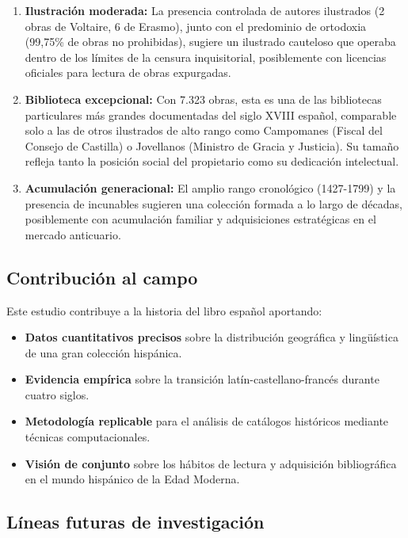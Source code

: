\documentclass[12pt,a4paper]{article}
\begin{document}
\begin{enumerate}
    \item \textbf{Ilustración moderada:} La presencia controlada de autores ilustrados (2 obras de Voltaire, 6 de Erasmo), junto con el predominio de ortodoxia (99,75\% de obras no prohibidas), sugiere un ilustrado cauteloso que operaba dentro de los límites de la censura inquisitorial, posiblemente con licencias oficiales para lectura de obras expurgadas.

    \item \textbf{Biblioteca excepcional:} Con 7.323 obras, esta es una de las bibliotecas particulares más grandes documentadas del siglo XVIII español, comparable solo a las de otros ilustrados de alto rango como Campomanes (Fiscal del Consejo de Castilla) o Jovellanos (Ministro de Gracia y Justicia). Su tamaño refleja tanto la posición social del propietario como su dedicación intelectual.

    \item \textbf{Acumulación generacional:} El amplio rango cronológico (1427-1799) y la presencia de incunables sugieren una colección formada a lo largo de décadas, posiblemente con acumulación familiar y adquisiciones estratégicas en el mercado anticuario.
\end{enumerate}

\subsection{Contribución al campo}

Este estudio contribuye a la historia del libro español aportando:

\begin{itemize}
    \item \textbf{Datos cuantitativos precisos} sobre la distribución geográfica y lingüística de una gran colección hispánica.

    \item \textbf{Evidencia empírica} sobre la transición latín-castellano-francés durante cuatro siglos.

    \item \textbf{Metodología replicable} para el análisis de catálogos históricos mediante técnicas computacionales.

    \item \textbf{Visión de conjunto} sobre los hábitos de lectura y adquisición bibliográfica en el mundo hispánico de la Edad Moderna.
\end{itemize}

\subsection{Líneas futuras de investigación}
\end{document}
